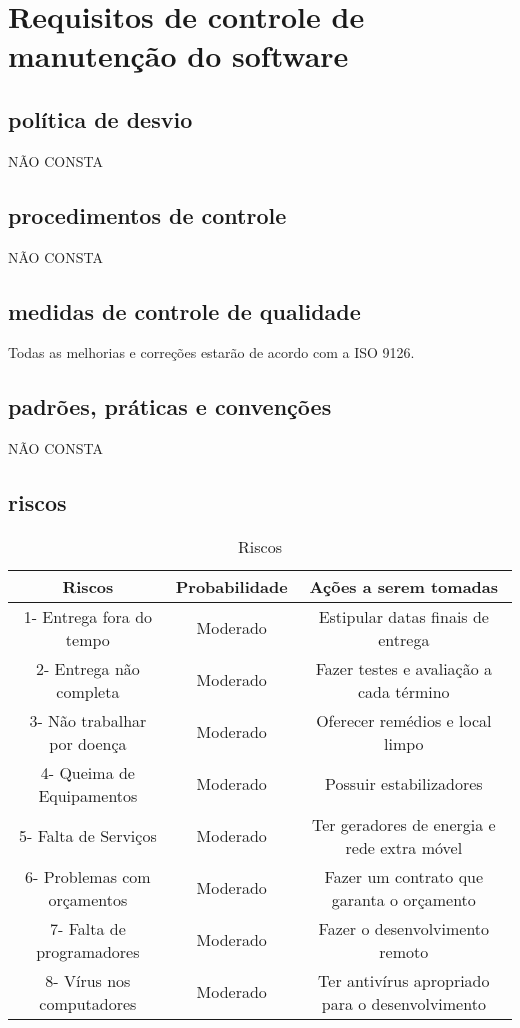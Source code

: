\chapter{Requisitos de controle de manutenção do software}

\section{política de desvio}
NÃO CONSTA
\section{procedimentos de controle}
NÃO CONSTA
\section{medidas de controle de qualidade}
Todas as melhorias e correções  estarão de acordo com a ISO 9126.
\section{padrões, práticas e convenções}
NÃO CONSTA
\section{riscos}
\begin{table}[!htb]
	\caption[Riscos]{Riscos}
	\label{tab:riscos}
	\centering
	\begin{tabular}{c|c|c}
		Riscos                           &  Probabilidade        &  Ações a serem tomadas		\\ \hline
		1- Entrega fora do tempo         &  Moderado             &  Estipular datas finais de entrega 	 \\
	  2- Entrega não completa          & 	Moderado	           &  Fazer testes e avaliação a cada término    \\
    3- Não trabalhar por doença      & 	Moderado	           &  Oferecer remédios e local limpo          	 \\
    4- Queima de Equipamentos		& Moderado		& Possuir estabilizadores 			\\
    5- Falta de Serviços		& Moderado 		& Ter geradores de energia e rede extra móvel \\
    6- Problemas com orçamentos		& Moderado		& Fazer um contrato que garanta o orçamento \\
    7- Falta de programadores		& Moderado		& Fazer o desenvolvimento remoto \\
    8- Vírus nos computadores		& Moderado		& Ter antivírus apropriado para o desenvolvimento \\
	\end{tabular}
\end{table}

